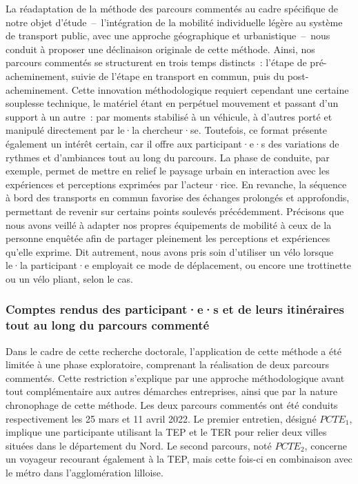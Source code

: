 \begin{refsegment}
La réadaptation de la méthode des parcours commentés au cadre spécifique de notre objet d’étude~–~l’intégration de la mobilité individuelle légère au système de transport public, avec une approche géographique et urbanistique~–~nous conduit à proposer une déclinaison originale de cette méthode. Ainsi, nos parcours commentés se structurent en trois temps distincts~: l’étape de pré-acheminement, suivie de l’étape en transport en commun, puis du post-acheminement. Cette innovation méthodologique requiert cependant une certaine souplesse technique, le matériel étant en perpétuel mouvement et passant d’un support à un autre~: par moments stabilisé à un véhicule, à d'autres porté et manipulé directement par le·la chercheur·se. Toutefois, ce format présente également un intérêt certain, car il offre aux participant·e·s des variations de rythmes et d’ambiances tout au long du parcours. La phase de conduite, par exemple, permet de mettre en relief le paysage urbain en interaction avec les expériences et perceptions exprimées par l'acteur·rice. En revanche, la séquence à bord des transports en commun favorise des échanges prolongés et approfondis, permettant de revenir sur certains points soulevés précédemment. Précisons que nous avons veillé à adapter nos propres équipements de mobilité à ceux de la personne enquêtée afin de partager pleinement les perceptions et expériences qu’elle exprime. Dit autrement, nous avons pris soin d’utiliser un vélo lorsque le·la participant·e employait ce mode de déplacement, ou encore une trottinette ou un vélo pliant, selon le cas.%

\subsubsection*{Comptes rendus des participant·e·s et de leurs itinéraires tout au long du parcours commenté
    \label{chap3:parcours-commente-administration-participants}
    }

Dans le cadre de cette recherche doctorale, l’application de cette méthode a été limitée à une phase exploratoire, comprenant la réalisation de deux parcours commentés. Cette restriction s’explique par une approche méthodologique avant tout complémentaire aux autres démarches entreprises, ainsi que par la nature chronophage de cette méthode. Les deux parcours commentés ont été conduits respectivement les 25 mars et 11 avril 2022. Le premier entretien, désigné \(PCTE_{1}\), implique une participante utilisant la \acrshort{TEP} et le \acrshort{TER} pour relier deux villes situées dans le département du Nord. Le second parcours, noté \(PCTE_{2}\), concerne un voyageur recourant également à la \acrshort{TEP}, mais cette fois-ci en combinaison avec le métro dans l’agglomération lilloise.%


\end{refsegment}
